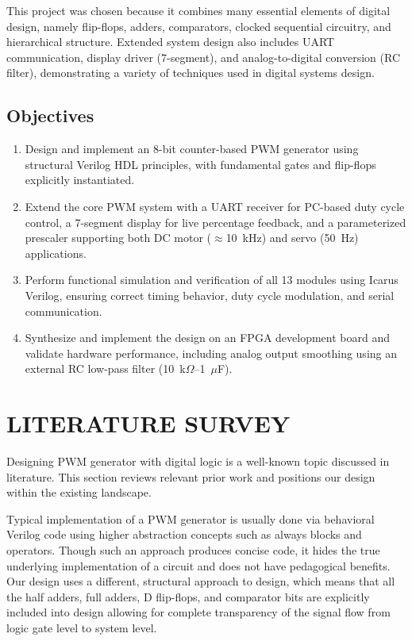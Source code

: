 \documentclass[12pt,a4paper]{article}
\begin{document}
This project was chosen because it combines many essential elements of digital design, namely flip-flops, adders, comparators, clocked sequential circuitry, and hierarchical structure. Extended system design also includes UART communication, display driver (7-segment), and analog-to-digital conversion (RC filter), demonstrating a variety of techniques used in digital systems design.

\subsection{Objectives}
\begin{enumerate}[label=\textbf{Objective \arabic*:}]
\item Design and implement an 8-bit counter-based PWM generator using structural Verilog HDL principles, with fundamental gates and flip-flops explicitly instantiated.
\item Extend the core PWM system with a UART receiver for PC-based duty cycle control, a 7-segment display for live percentage feedback, and a parameterized prescaler supporting both DC motor ($\approx$10~kHz) and servo (50~Hz) applications.
\item Perform functional simulation and verification of all 13 modules using Icarus Verilog, ensuring correct timing behavior, duty cycle modulation, and serial communication.
\item Synthesize and implement the design on an FPGA development board and validate hardware performance, including analog output smoothing using an external RC low-pass filter (10~k$\Omega$--1~$\mu$F).
\end{enumerate}

\section{LITERATURE SURVEY}

Designing PWM generator with digital logic is a well-known topic discussed in literature. This section reviews relevant prior work and positions our design within the existing landscape.

Typical implementation of a PWM generator is usually done via behavioral Verilog code using higher abstraction concepts such as always blocks and operators. Though such an approach produces concise code, it hides the true underlying implementation of a circuit and does not have pedagogical benefits. Our design uses a different, structural approach to design, which means that all the half adders, full adders, D flip-flops, and comparator bits are explicitly included into design allowing for complete transparency of the signal flow from logic gate level to system level.
\end{document}
